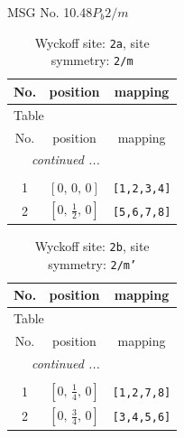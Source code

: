 \documentclass[fleqn,8pt]{jsarticle}
\begin{document}
\setcounter{MaxMatrixCols}{32}

\renewcommand{\tablename}{Table~}
\renewcommand{\figurename}{Figure~}
\begin{center}
\LARGE
MSG No. 10.48\quad$P_{b}2/m$
\end{center}
\renewcommand{\arraystretch}{1.2}
\begin{longtable}{ccc}
\caption{Wyckoff site: {\tt 2a}, site symmetry: {\tt 2/m}}
 \\
 \hline \hline
No. & position & mapping \\ \hline \endfirsthead

\multicolumn{2}{l}{\tablename\ \thetable{}} \\
 \hline \hline
No. & position & mapping \\ \hline \endhead

 \hline \hline
\multicolumn{2}{r}{\footnotesize\it continued ...} \\ \endfoot

 \hline \hline
\multicolumn{2}{r}{} \\ \endlastfoot

1 & $\left[ 0,\, 0,\, 0 \right]$ & {\tt [1,2,3,4]} \\ \hline
2 & $\left[ 0,\, \frac{1}{2},\, 0 \right]$ & {\tt [5,6,7,8]} \\
\end{longtable}
\renewcommand{\arraystretch}{1.2}
\begin{longtable}{ccc}
\caption{Wyckoff site: {\tt 2b}, site symmetry: {\tt 2/m'}}
 \\
 \hline \hline
No. & position & mapping \\ \hline \endfirsthead

\multicolumn{2}{l}{\tablename\ \thetable{}} \\
 \hline \hline
No. & position & mapping \\ \hline \endhead

 \hline \hline
\multicolumn{2}{r}{\footnotesize\it continued ...} \\ \endfoot

 \hline \hline
\multicolumn{2}{r}{} \\ \endlastfoot

1 & $\left[ 0,\, \frac{1}{4},\, 0 \right]$ & {\tt [1,2,7,8]} \\ \hline
2 & $\left[ 0,\, \frac{3}{4},\, 0 \right]$ & {\tt [3,4,5,6]} \\
\end{longtable}
\renewcommand{\arraystretch}{1.2}
\end{document}
